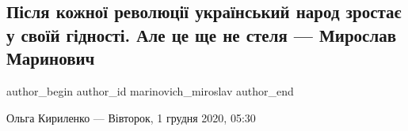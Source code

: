  
 
 
 
 
 
\subsection{Після кожної революції український народ зростає у своїй гідності. Але це ще не стеля --- Мирослав Маринович}
\label{sec:01_12_2020.news.ua.pravda.marinovich_miroslav.1.revolution}
\ifcmt
	author_begin
   author_id marinovich_miroslav
	author_end
\fi

Ольга Кириленко --- Вівторок, 1 грудня 2020, 05:30

